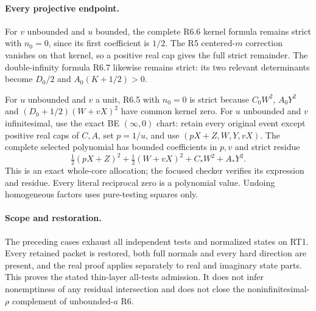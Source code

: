 \paragraph{Every projective endpoint.}
For $v$ unbounded and $u$ bounded, the complete R6.6 kernel formula
remains strict with $n_0=0$, since its first coefficient is $1/2$.
The R5 centered-$m$ correction vanishes on that kernel, so a positive
real cap gives the full strict remainder. The double-infinity formula
R6.7 likewise remains strict: its two relevant determinants become
$D_0/2$ and $A_0(K+1/2)>0$.

For $u$ unbounded and $v$ a unit, R6.5 with $n_0=0$ is strict because
$C_0W^2$, $A_0Y^2$ and $(D_0+1/2)(W+vX)^2$ have common kernel zero.
For $u$ unbounded and $v$ infinitesimal, use the exact BE
$(\infty,0)$ chart: retain every original event except positive real
caps of $C,A$, set $p=1/u$, and use
$(pX+Z,W,Y,vX)$. The complete selected polynomial has bounded
coefficients in $p,v$ and strict residue
\[
 \tfrac12(pX+Z)^2+\tfrac12(W+vX)^2+C_*W^2+A_*Y^2.
\]
This is an exact whole-core allocation; the focused checker verifies
its expression and residue. Every literal reciprocal zero is a
polynomial value. Undoing homogeneous factors uses pure-testing
squares only.

\paragraph{Scope and restoration.}
The preceding cases exhaust all independent tests and normalized
states on RT1. Every retained packet is restored, both full normals
and every hard direction are present, and the real proof applies
separately to real and imaginary state parts. This proves the stated
thin-layer all-tests admission. It does not infer nonemptiness of any
residual intersection and does not close the noninfinitesimal-$\rho$
complement of unbounded-$a$ R6.
